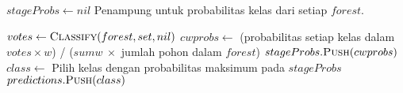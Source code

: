\begin{center}
\begin{algorithmic}[1]
		\State $ stageProbs \gets nil $
		\Comment Penampung untuk probabilitas kelas dari setiap $forest$.

			\State $ votes \gets \Call{Classify}{forest, set, nil} $
			\State $ cwprobs \gets $
				(probabilitas setiap kelas dalam $votes \times w$) /
				($ sumw ~ \times $ jumlah pohon dalam $forest$)
			\State $ stageProbs.\Call{Push}{cwprobs} $
		\EndFor
\newpage
		\State $ class \gets $ Pilih kelas dengan probabilitas maksimum pada $stageProbs$
		\State $ predictions.\Call{Push}{class} $
	\EndFor
	\\
	\State {}
\EndFunction
	\end{algorithmic}
\end{center}
